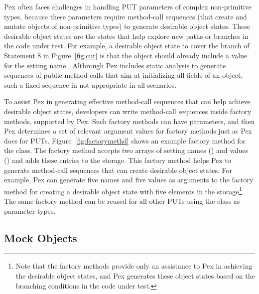 Pex often faces challenges in handling PUT parameters of complex non-primitive types, because these parameters require method-call sequences (that create and mutate objects of non-primitive types) to generate desirable object states. These desirable object states are the states that help explore new paths or branches in the code under test. For example, a desirable object state to cover the  branch of Statement 8 in Figure~\ref{fig:cut} is that the  object should already include a value for the setting name . Althrough Pex includes static analysis to generate sequences of public method calls that aim at initializing all fields of an object, such a fixed sequence in not appropriate in all scenarios.

To assist Pex in generating effective method-call sequences that can help achieve desirable object states, developers can write method-call sequences inside factory methods, supported by Pex. Such factory methods can have parameters, and then Pex determines a set of relevant argument values for factory methods just as Pex does for PUTs. Figure~\ref{fig:factorymethd} shows an example factory method for the  class. The factory method accepts two arrays of setting names () and values () and adds these entries to the storage. This factory method helps Pex to generate method-call sequences that can create desirable object states. For example, Pex can generate five names and five values as arguments to the factory method for creating a desirable object state with five elements in the storage\footnote{Note that the factory methods provide only an assistance to Pex in achieving the desirable object states, and Pex generates these object states based on the branching conditions in the code under test.}. The same factory method can be reused for all other PUTs using the  class as parameter types.

\subsection{Mock Objects} 
\label{sec:mock}

